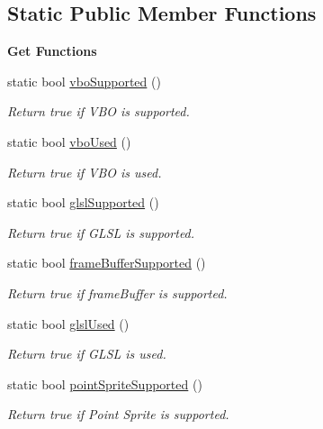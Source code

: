 \subsection*{Static Public Member Functions}
\begin{Indent}{\bf Get Functions}\par
\begin{DoxyCompactItemize}
\item 
static bool \hyperlink{class_g_l_c___state_a59e47ef8267df8603a010e1d5e52c8f1}{vbo\-Supported} ()
\begin{DoxyCompactList}\small\item\em Return true if V\-B\-O is supported. \end{DoxyCompactList}\item 
static bool \hyperlink{class_g_l_c___state_a71d34149d665705f59105805b5bfc7f8}{vbo\-Used} ()
\begin{DoxyCompactList}\small\item\em Return true if V\-B\-O is used. \end{DoxyCompactList}\item 
static bool \hyperlink{class_g_l_c___state_ac63bc594a0b5ed09bd4bf107e3e285af}{glsl\-Supported} ()
\begin{DoxyCompactList}\small\item\em Return true if G\-L\-S\-L is supported. \end{DoxyCompactList}\item 
static bool \hyperlink{class_g_l_c___state_a5e7f8aac6eadec15008430ac6e365257}{frame\-Buffer\-Supported} ()
\begin{DoxyCompactList}\small\item\em Return true if frame\-Buffer is supported. \end{DoxyCompactList}\item 
static bool \hyperlink{class_g_l_c___state_ae17c499bd6159893820e360b81b073c8}{glsl\-Used} ()
\begin{DoxyCompactList}\small\item\em Return true if G\-L\-S\-L is used. \end{DoxyCompactList}\item 
static bool \hyperlink{class_g_l_c___state_a229450cc03b6fa3cdbd73f3b8d8042e9}{point\-Sprite\-Supported} ()
\begin{DoxyCompactList}\small\item\em Return true if Point Sprite is supported. \end{DoxyCompactList}\item 

\end{DoxyCompactItemize}
\end{Indent}
